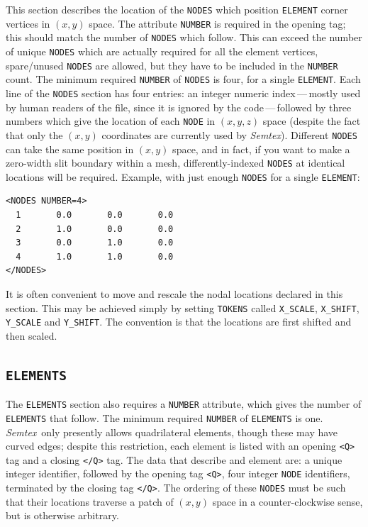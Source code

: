 \documentclass[11pt]{report}
\newcommand{\Semtex}{\emph{Semtex}} \newcommand{\Dog}{\emph{Dog}}
\begin{document}
This section describes the location of the \verb|NODES| which position
\verb|ELEMENT| corner vertices in $(x,y)$ space.  The attribute
\verb|NUMBER| is required in the opening tag; this should match the
number of \verb|NODES| which follow.  This can exceed the number of
unique \verb|NODES| which are actually required for all the element
vertices, \ie spare/unused \verb|NODES| are allowed, but they have to
be included in the \verb|NUMBER| count. The minimum required
\verb|NUMBER| of \verb|NODES| is four, \ie for a single
\verb|ELEMENT|.  Each line of the \verb|NODES| section has four
entries: an integer numeric index\,---\,mostly used by human readers
of the file, since it is ignored by the code\,---\,followed by three
numbers which give the location of each \verb|NODE| in $(x,y,z)$ space
(despite the fact that only the $(x,y)$ coordinates are currently used
by \Semtex).  Different \verb|NODES| can take the same position in
$(x,y)$ space, and in fact, if you want to make a zero-width slit
boundary within a mesh, differently-indexed \verb|NODES| at identical
locations will be required.  Example, with just enough \verb|NODES|
for a single \verb|ELEMENT|:
%
{\small
\begin{verbatim}
<NODES NUMBER=4>
  1       0.0       0.0       0.0
  2       1.0       0.0       0.0
  3       0.0       1.0       0.0
  4       1.0       1.0       0.0
</NODES>
\end{verbatim}
}
%
It is often convenient to move and rescale the nodal locations
declared in this section. This may be achieved simply by setting
\verb|TOKENS| called \verb|X_SCALE|, \verb|X_SHIFT|, \verb|Y_SCALE|
and \verb|Y_SHIFT|.  The convention is that the locations are first
shifted and then scaled.

\subsection{\texttt{ELEMENTS}}
\label{sec.elements}

The \verb|ELEMENTS| section also requires a \verb|NUMBER| attribute,
which gives the number of \verb|ELEMENTS| that follow.  The minimum
required \verb|NUMBER| of \verb|ELEMENTS| is one.  \Semtex\ only
presently allows quadrilateral elements, though these may have curved
edges; despite this restriction, each element is listed with an
opening \verb|<Q>| tag and a closing \verb|</Q>| tag.  The data that
describe and element are: a unique integer identifier, followed by the
opening tag \verb|<Q>|, four integer \verb|NODE| identifiers,
terminated by the closing tag \verb|</Q>|.  The ordering of these
\verb|NODES| must be such that their locations traverse a patch of
$(x,y)$ space in a counter-clockwise sense, but is otherwise
arbitrary.
\end{document}
